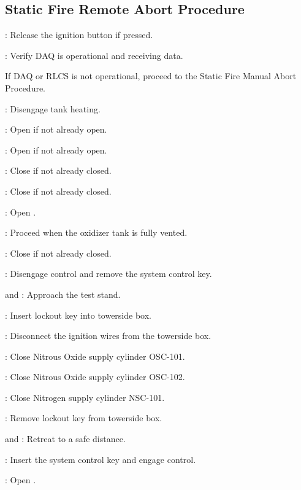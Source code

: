 \subsection{Static Fire Remote Abort Procedure}
\begin{checklist}
   \item \rlcs{}: Release the ignition button if pressed.
    \item \daq{}: Verify DAQ is operational and receiving data. 
    \begin{checklist}[label=$\bullet$]
            \item If DAQ or RLCS is not operational, proceed to the Static Fire Manual Abort Procedure. 
            \end{checklist}
    \item \rlcs{}: Disengage tank heating. 
    \item \rlcs{}: Open \vent{} if not already open. 
    \item \rlcs{}: Open \oxiso{} if not already open. 
    \item \rlcs{}: Close \oxfill{} if not already closed. 
    \item \rlcs{}: Close \purge{} if not already closed. 
    \item \rlcs{}: Open \oxdrain{}.
    \item \ops{}: Proceed when the oxidizer tank is fully vented. 
    \item \rlcs{}: Close \inj{} if not already closed.
    \item \rlcs{}: Disengage control and remove the system control key. 
    \item \primary{} and \secondary{}: Approach the test stand. 
    \item \secondary{}: Insert lockout key into towerside box. 
    \item \secondary{}: Disconnect the ignition wires from the towerside box. 
    \item \primary{}: Close Nitrous Oxide supply cylinder OSC-101. 
    \item \primary{}: Close Nitrous Oxide supply cylinder OSC-102. 
    \item \primary{}: Close Nitrogen supply cylinder NSC-101. 
    \item \secondary{}: Remove lockout key from towerside box.
    \item \primary{} and \secondary{}: Retreat to a safe distance. 
    \item \rlcs{}: Insert the system control key and engage control. 
    \item \rlcs{}: Open \oxfill{}.

\end{checklist}
